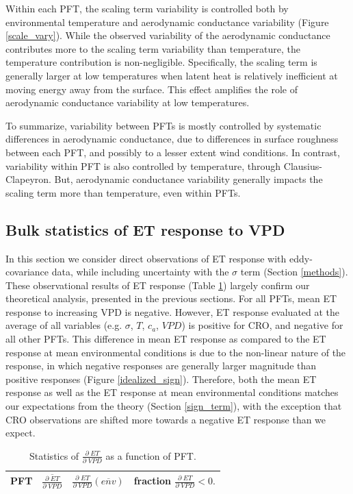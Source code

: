 \documentclass[draft,linenumbers]{afmjournal}
\begin{document}
Within each PFT, the scaling term variability is controlled both by
environmental temperature and aerodynamic conductance variability
(Figure \ref{scale_vary}). While the observed variability of the
aerodynamic conductance contributes more to the scaling term
variability than temperature, the temperature contribution is
non-negligible. Specifically, the scaling term is generally larger at
low temperatures when latent heat is relatively inefficient at moving
energy away from the surface. This effect amplifies the role of
aerodynamic conductance variability at low temperatures.

To summarize, variability between PFTs is mostly controlled by
systematic differences in aerodynamic conductance, due to differences
in surface roughness between each PFT, and possibly to a lesser extent
wind conditions. In contrast, variability within PFT is also
controlled by temperature, through Clausius-Clapeyron. But,
aerodynamic conductance variability generally impacts the scaling term
more than temperature, even within PFTs.

\subsection{Bulk statistics of ET response to VPD}
\label{stats_sec}

In this section we consider direct observations of ET response with
eddy-covariance data, while including uncertainty with the $\sigma$
term (Section \ref{methods}). These observational results of ET
response (Table \ref{stats}) largely confirm our theoretical analysis, presented in the previous sections. For all PFTs, mean ET response to increasing VPD
is negative. However, ET response evaluated at the average of all
variables (e.g. $\sigma$, $T$, $c_a$, $VPD$) is positive for CRO, and
negative for all other PFTs. This difference in mean ET response as
compared to the ET response at mean environmental conditions is due to
the non-linear nature of the response, in which negative responses are
generally larger magnitude than positive responses (Figure
\ref{idealized_sign}). Therefore, both the mean ET response as well as
the ET response at mean environmental conditions matches our
expectations from the theory (Section \ref{sign_term}), with the
exception that CRO observations are shifted more towards a negative ET
response than we expect.

\begin{table}
  \caption{Statistics of $\frac{\partial \; ET}{\partial \; VPD}$ as a
    function of PFT.}
  \centering
  \begin{tabular}{l c c c}
    \hline
    PFT & $\overline{\frac{\partial \; ET}{\partial \; VPD}}$ & $\frac{\partial \; ET}{\partial \; VPD}\left(\overline{env}\right)$ & fraction $\frac{\partial \; ET}{\partial \; VPD} < 0.$ \\
    \hline
    
    \hline
  \end{tabular}
  \label{stats}
\end{table}
\end{document}
